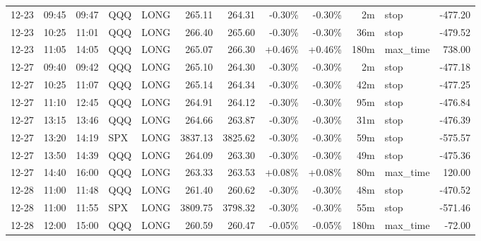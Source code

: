 \documentclass[11pt,a4paper,twoside]{article}
\begin{document}
\begin{center}
\begin{longtable}{>{\color{txtmain}}l l l l l r r r r r >{\color{txtmain}}l r}
12-23 & 09:45 & 09:47 & QQQ & LONG & 265.11 & 264.31 & \textcolor{lossred}{-0.30\%} & \textcolor{lossred}{-0.30\%} & 2m & stop & \textcolor{lossred}{-477.20} \\
12-23 & 10:25 & 11:01 & QQQ & LONG & 266.40 & 265.60 & \textcolor{lossred}{-0.30\%} & \textcolor{lossred}{-0.30\%} & 36m & stop & \textcolor{lossred}{-479.52} \\
12-23 & 11:05 & 14:05 & QQQ & LONG & 265.07 & 266.30 & \textcolor{wingreen}{+0.46\%} & \textcolor{wingreen}{+0.46\%} & 180m & max\_time & \textcolor{wingreen}{738.00} \\
12-27 & 09:40 & 09:42 & QQQ & LONG & 265.10 & 264.30 & \textcolor{lossred}{-0.30\%} & \textcolor{lossred}{-0.30\%} & 2m & stop & \textcolor{lossred}{-477.18} \\
12-27 & 10:25 & 11:07 & QQQ & LONG & 265.14 & 264.34 & \textcolor{lossred}{-0.30\%} & \textcolor{lossred}{-0.30\%} & 42m & stop & \textcolor{lossred}{-477.25} \\
12-27 & 11:10 & 12:45 & QQQ & LONG & 264.91 & 264.12 & \textcolor{lossred}{-0.30\%} & \textcolor{lossred}{-0.30\%} & 95m & stop & \textcolor{lossred}{-476.84} \\
12-27 & 13:15 & 13:46 & QQQ & LONG & 264.66 & 263.87 & \textcolor{lossred}{-0.30\%} & \textcolor{lossred}{-0.30\%} & 31m & stop & \textcolor{lossred}{-476.39} \\
12-27 & 13:20 & 14:19 & SPX & LONG & 3837.13 & 3825.62 & \textcolor{lossred}{-0.30\%} & \textcolor{lossred}{-0.30\%} & 59m & stop & \textcolor{lossred}{-575.57} \\
12-27 & 13:50 & 14:39 & QQQ & LONG & 264.09 & 263.30 & \textcolor{lossred}{-0.30\%} & \textcolor{lossred}{-0.30\%} & 49m & stop & \textcolor{lossred}{-475.36} \\
12-27 & 14:40 & 16:00 & QQQ & LONG & 263.33 & 263.53 & \textcolor{wingreen}{+0.08\%} & \textcolor{wingreen}{+0.08\%} & 80m & max\_time & \textcolor{wingreen}{120.00} \\
12-28 & 11:00 & 11:48 & QQQ & LONG & 261.40 & 260.62 & \textcolor{lossred}{-0.30\%} & \textcolor{lossred}{-0.30\%} & 48m & stop & \textcolor{lossred}{-470.52} \\
12-28 & 11:00 & 11:55 & SPX & LONG & 3809.75 & 3798.32 & \textcolor{lossred}{-0.30\%} & \textcolor{lossred}{-0.30\%} & 55m & stop & \textcolor{lossred}{-571.46} \\
12-28 & 12:00 & 15:00 & QQQ & LONG & 260.59 & 260.47 & \textcolor{lossred}{-0.05\%} & \textcolor{lossred}{-0.05\%} & 180m & max\_time & \textcolor{lossred}{-72.00} \\

\end{longtable}
\end{center}
\end{document}

